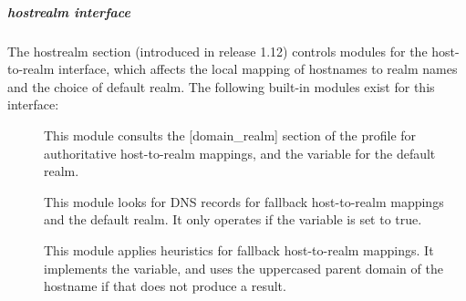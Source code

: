 \documentclass[letterpaper,10pt,english]{sphinxmanual}
\begin{document}
\subparagraph{hostrealm interface}
\label{\detokenize{admin/conf_files/krb5_conf:hostrealm-interface}}\label{\detokenize{admin/conf_files/krb5_conf:hostrealm}}
The hostrealm section (introduced in release 1.12) controls modules
for the host-to-realm interface, which affects the local mapping of
hostnames to realm names and the choice of default realm.  The following
built-in modules exist for this interface:
\begin{description}
\item[{}] \leavevmode
This module consults the {[}domain\_realm{]} section of the profile for
authoritative host-to-realm mappings, and the 
variable for the default realm.

\item[{}] \leavevmode
This module looks for DNS records for fallback host-to-realm
mappings and the default realm.  It only operates if the
 variable is set to true.

\item[{}] \leavevmode
This module applies heuristics for fallback host-to-realm
mappings.  It implements the  variable, and
uses the uppercased parent domain of the hostname if that does not
produce a result.

\end{description}
\end{document}
